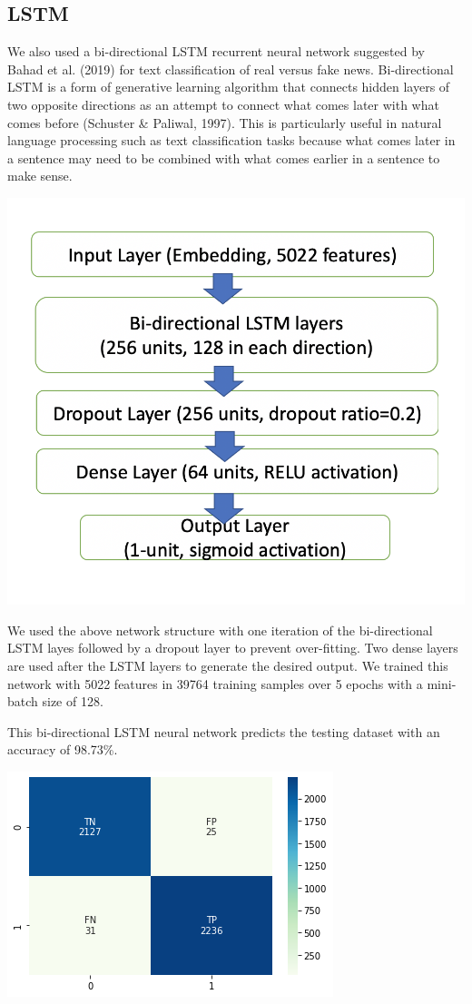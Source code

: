 \documentclass{article}
\begin{document}
\begin{multicols}{2}
\subsection{LSTM}
We also used a bi-directional LSTM recurrent neural network suggested by Bahad et al. (2019) for text classification of real versus fake news. Bi-directional LSTM is a form of generative learning algorithm that connects hidden layers of two opposite directions as an attempt to connect what comes later with what comes before (Schuster \& Paliwal, 1997). This is particularly useful in natural language processing such as text classification tasks because what comes later in a sentence may need to be combined with what comes earlier in a sentence to make sense.

\begin{center}
\includegraphics[scale=0.4]{images/img5.png}
\end{center}

We used the above network structure with one iteration of the bi-directional LSTM layes followed by a dropout layer to prevent over-fitting. Two dense layers are used after the LSTM layers to generate the desired output. We trained this network with 5022 features in 39764 training samples over 5 epochs with a mini-batch size of 128.


This bi-directional LSTM neural network predicts the testing dataset with an accuracy of 98.73\%.

\includegraphics[scale=0.6]{images/lstmcm.png}



\end{multicols}
\end{document}
